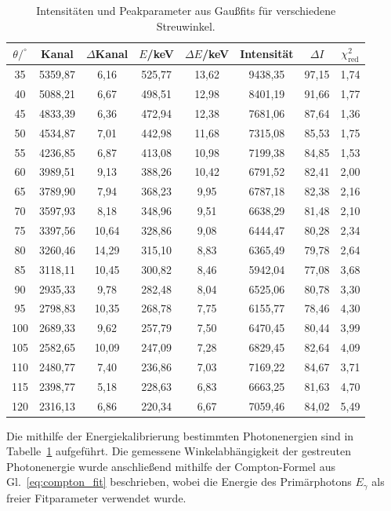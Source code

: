 \begin{table}[htbp]
\centering
\caption{Intensitäten und Peakparameter aus Gaußfits für verschiedene Streuwinkel.}
\begin{tabular}{cccccccc}
\hline
$\theta/^\circ$ & Kanal & $\Delta$Kanal & $E$/keV & $\Delta E$/keV & Intensität & $\Delta I$ & $\chi^2_\mathrm{red}$ \\
\hline
35  & 5359,87 & 6,16  & 525,77 & 13,62 & 9438,35 & 97,15 & 1,74 \\
40  & 5088,21 & 6,67  & 498,51 & 12,98 & 8401,19 & 91,66 & 1,77 \\
45  & 4833,39 & 6,36  & 472,94 & 12,38 & 7681,06 & 87,64 & 1,36 \\
50  & 4534,87 & 7,01  & 442,98 & 11,68 & 7315,08 & 85,53 & 1,75 \\
55  & 4236,85 & 6,87  & 413,08 & 10,98 & 7199,38 & 84,85 & 1,53 \\
60  & 3989,51 & 9,13  & 388,26 & 10,42 & 6791,52 & 82,41 & 2,00 \\
65  & 3789,90 & 7,94  & 368,23 & 9,95  & 6787,18 & 82,38 & 2,16 \\
70  & 3597,93 & 8,18  & 348,96 & 9,51  & 6638,29 & 81,48 & 2,10 \\
75  & 3397,56 & 10,64 & 328,86 & 9,08  & 6444,47 & 80,28 & 2,34 \\
80  & 3260,46 & 14,29 & 315,10 & 8,83  & 6365,49 & 79,78 & 2,64 \\
85  & 3118,11 & 10,45 & 300,82 & 8,46  & 5942,04 & 77,08 & 3,68 \\
90  & 2935,33 & 9,78  & 282,48 & 8,04  & 6525,06 & 80,78 & 3,30 \\
95  & 2798,83 & 10,35 & 268,78 & 7,75  & 6155,77 & 78,46 & 4,30 \\
100 & 2689,33 & 9,62  & 257,79 & 7,50  & 6470,45 & 80,44 & 3,99 \\
105 & 2582,65 & 10,09 & 247,09 & 7,28  & 6829,45 & 82,64 & 4,09 \\
110 & 2480,77 & 7,40  & 236,86 & 7,03  & 7169,22 & 84,67 & 3,71 \\
115 & 2398,77 & 5,18  & 228,63 & 6,83  & 6663,25 & 81,63 & 4,70 \\
120 & 2316,13 & 6,86  & 220,34 & 6,67  & 7059,46 & 84,02 & 5,49 \\
\hline
\end{tabular}
\label{tab:gauss_intensities}
\end{table}

Die mithilfe der Energiekalibrierung bestimmten Photonenergien sind in Tabelle~\ref{tab:gauss_intensities} aufgeführt. 
Die gemessene Winkelabhängigkeit der gestreuten Photonenergie wurde anschließend mithilfe der Compton-Formel aus Gl.~\ref{eq:compton_fit} beschrieben, wobei die Energie des Primärphotons $E_\gamma$ als freier Fitparameter verwendet wurde.

